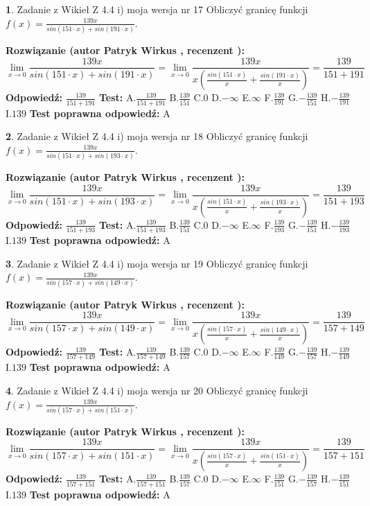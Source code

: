 \documentclass[12pt, a4paper]{article}
\theoremstyle{definition} %
\newtheorem{zad}{}
\newcommand{\zadStart}[1]{\begin{zad}#1\newline}
\newcommand{\zadStop}{\end{zad}}
\newcommand{\rozwStart}[2]{\noindent \textbf{Rozwiązanie (autor #1 , recenzent #2): }\newline}
\newcommand{\rozwStop}{\newline}
\newcommand{\odpStart}{\noindent \textbf{Odpowiedź:}\newline}
\newcommand{\odpStop}{\newline}
\newcommand{\testStart}{\noindent \textbf{Test:}\newline}
\newcommand{\testStop}{\newline}
\newcommand{\kluczStart}{\noindent \textbf{Test poprawna odpowiedź:}\newline}
\newcommand{\kluczStop}{\newline}
\begin{document}
\zadStart{Zadanie z Wikieł Z 4.4 i) moja wersja nr 17}
Obliczyć granicę funkcji $f(x)=\frac{139x}{sin(151\cdot x) +sin(191\cdot x)}$.
\zadStop
\rozwStart{Patryk Wirkus}{}
$$\lim\limits_{x\to 0}\frac{139x}{sin(151\cdot x) +sin(191\cdot x)}=\lim\limits_{x\to 0}\frac{139x}{x(\frac{sin(151\cdot x)}{x}+\frac{sin(191\cdot x)}{x})}=\frac{139}{151+191}$$
\rozwStop
\odpStart
$\frac{139}{151+191}$
\odpStop
\testStart
A.$\frac{139}{151+191}$
B.$\frac{139}{151}$
C.$0$
D.$-\infty$
E.$\infty$
F.$\frac{139}{191}$
G.$-\frac{139}{151}$
H.$-\frac{139}{191}$
I.$139$
\testStop
\kluczStart
A
\kluczStop



\zadStart{Zadanie z Wikieł Z 4.4 i) moja wersja nr 18}
Obliczyć granicę funkcji $f(x)=\frac{139x}{sin(151\cdot x) +sin(193\cdot x)}$.
\zadStop
\rozwStart{Patryk Wirkus}{}
$$\lim\limits_{x\to 0}\frac{139x}{sin(151\cdot x) +sin(193\cdot x)}=\lim\limits_{x\to 0}\frac{139x}{x(\frac{sin(151\cdot x)}{x}+\frac{sin(193\cdot x)}{x})}=\frac{139}{151+193}$$
\rozwStop
\odpStart
$\frac{139}{151+193}$
\odpStop
\testStart
A.$\frac{139}{151+193}$
B.$\frac{139}{151}$
C.$0$
D.$-\infty$
E.$\infty$
F.$\frac{139}{193}$
G.$-\frac{139}{151}$
H.$-\frac{139}{193}$
I.$139$
\testStop
\kluczStart
A
\kluczStop



\zadStart{Zadanie z Wikieł Z 4.4 i) moja wersja nr 19}
Obliczyć granicę funkcji $f(x)=\frac{139x}{sin(157\cdot x) +sin(149\cdot x)}$.
\zadStop
\rozwStart{Patryk Wirkus}{}
$$\lim\limits_{x\to 0}\frac{139x}{sin(157\cdot x) +sin(149\cdot x)}=\lim\limits_{x\to 0}\frac{139x}{x(\frac{sin(157\cdot x)}{x}+\frac{sin(149\cdot x)}{x})}=\frac{139}{157+149}$$
\rozwStop
\odpStart
$\frac{139}{157+149}$
\odpStop
\testStart
A.$\frac{139}{157+149}$
B.$\frac{139}{157}$
C.$0$
D.$-\infty$
E.$\infty$
F.$\frac{139}{149}$
G.$-\frac{139}{157}$
H.$-\frac{139}{149}$
I.$139$
\testStop
\kluczStart
A
\kluczStop



\zadStart{Zadanie z Wikieł Z 4.4 i) moja wersja nr 20}
Obliczyć granicę funkcji $f(x)=\frac{139x}{sin(157\cdot x) +sin(151\cdot x)}$.
\zadStop
\rozwStart{Patryk Wirkus}{}
$$\lim\limits_{x\to 0}\frac{139x}{sin(157\cdot x) +sin(151\cdot x)}=\lim\limits_{x\to 0}\frac{139x}{x(\frac{sin(157\cdot x)}{x}+\frac{sin(151\cdot x)}{x})}=\frac{139}{157+151}$$
\rozwStop
\odpStart
$\frac{139}{157+151}$
\odpStop
\testStart
A.$\frac{139}{157+151}$
B.$\frac{139}{157}$
C.$0$
D.$-\infty$
E.$\infty$
F.$\frac{139}{151}$
G.$-\frac{139}{157}$
H.$-\frac{139}{151}$
I.$139$
\testStop
\kluczStart
A
\kluczStop
\end{document}
